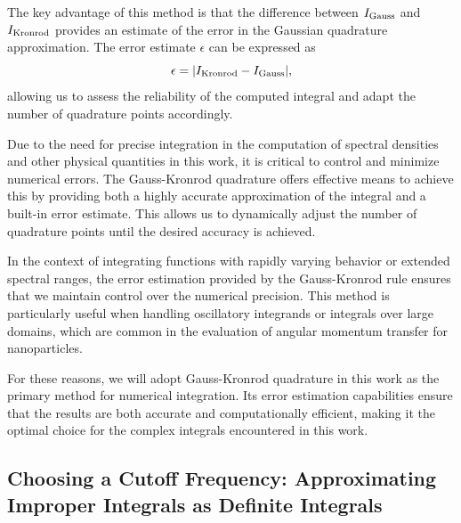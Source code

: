 The key advantage of this method is that the difference between $I_{\rm Gauss}$ and $I_{\rm Kronrod}$ provides an estimate of the error in the Gaussian quadrature approximation. The error estimate $\epsilon$ can be expressed as
\begin{equation}
    \epsilon = | I_{\rm Kronrod} - I_{\rm Gauss} |,
\end{equation}
allowing us to assess the reliability of the computed integral and adapt the number of quadrature points accordingly.


Due to the need for precise integration in the computation of spectral densities and other physical quantities in this work, it is critical to control and minimize numerical errors. The Gauss-Kronrod quadrature offers effective means to achieve this by providing both a highly accurate approximation of the integral and a built-in error estimate. This allows us to dynamically adjust the number of quadrature points until the desired accuracy is achieved.

In the context of integrating functions with rapidly varying behavior or extended spectral ranges, the error estimation provided by the Gauss-Kronrod rule ensures that we maintain control over the numerical precision. This method is particularly useful when handling oscillatory integrands or integrals over large domains, which are common in the evaluation of angular momentum transfer for nanoparticles.

For these reasons, we will adopt Gauss-Kronrod quadrature in this work as the primary method for numerical integration. Its error estimation capabilities ensure that the results are both accurate and computationally efficient, making it the optimal choice for the complex integrals encountered in this work.

%
\subsection{Choosing a Cutoff Frequency: Approximating Improper Integrals as Definite Integrals}

